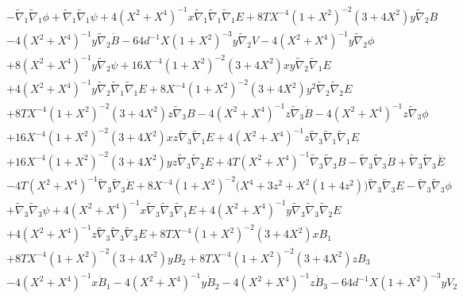 \documentclass[10pt,letterpaper]{article}
\numberwithin{equation}{section}
\begin{document}
\begin{appendices}
\begin{eqnarray}
&& -  \tilde{\nabla}_{1}\tilde{\nabla}_{1}\phi + \tilde{\nabla}_{1}\tilde{\nabla}_{1}\psi + 4 (X^2 + X^4)^{-1} x \tilde{\nabla}_{1}\tilde{\nabla}_{1}\tilde{\nabla}_{1}E + 8 T X^{-4} (1 + X^2)^{-2} (3 + 4 X^2) y \tilde{\nabla}_{2}B \nonumber \\ 
&& - 4 (X^2 + X^4)^{-1} y \tilde{\nabla}_{2}\dot{B} - 64 d^{-1} X (1 + X^2)^{-3} y \tilde{\nabla}_{2}V - 4 (X^2 + X^4)^{-1} y \tilde{\nabla}_{2}\phi \nonumber \\ 
&& + 8 (X^2 + X^4)^{-1} y \tilde{\nabla}_{2}\psi + 16 X^{-4} (1 + X^2)^{-2} (3 + 4 X^2) x y \tilde{\nabla}_{2}\tilde{\nabla}_{1}E \nonumber \\ 
&& + 4 (X^2 + X^4)^{-1} y \tilde{\nabla}_{2}\tilde{\nabla}_{1}\tilde{\nabla}_{1}E + 8 X^{-4} (1 + X^2)^{-2} (3 + 4 X^2) y^2 \tilde{\nabla}_{2}\tilde{\nabla}_{2}E \nonumber \\ 
&& + 8 T X^{-4} (1 + X^2)^{-2} (3 + 4 X^2) z \tilde{\nabla}_{3}B - 4 (X^2 + X^4)^{-1} z \tilde{\nabla}_{3}\dot{B} - 4 (X^2 + X^4)^{-1} z \tilde{\nabla}_{3}\phi \nonumber \\ 
&& + 16 X^{-4} (1 + X^2)^{-2} (3 + 4 X^2) x z \tilde{\nabla}_{3}\tilde{\nabla}_{1}E + 4 (X^2 + X^4)^{-1} z \tilde{\nabla}_{3}\tilde{\nabla}_{1}\tilde{\nabla}_{1}E \nonumber \\ 
&& + 16 X^{-4} (1 + X^2)^{-2} (3 + 4 X^2) y z \tilde{\nabla}_{3}\tilde{\nabla}_{2}E + 4 T (X^2 + X^4)^{-1} \tilde{\nabla}_{3}\tilde{\nabla}_{3}B -  \tilde{\nabla}_{3}\tilde{\nabla}_{3}\dot{B} + \tilde{\nabla}_{3}\tilde{\nabla}_{3}\overset{..}{E} \nonumber \\ 
&& - 4 T (X^2 + X^4)^{-1} \tilde{\nabla}_{3}\tilde{\nabla}_{3}\dot{E} + 8 X^{-4} (1 + X^2)^{-2} \bigl(X^4 + 3 z^2 + X^2 (1 + 4 z^2)\bigr) \tilde{\nabla}_{3}\tilde{\nabla}_{3}E -  \tilde{\nabla}_{3}\tilde{\nabla}_{3}\phi \nonumber \\ 
&& + \tilde{\nabla}_{3}\tilde{\nabla}_{3}\psi + 4 (X^2 + X^4)^{-1} x \tilde{\nabla}_{3}\tilde{\nabla}_{3}\tilde{\nabla}_{1}E + 4 (X^2 + X^4)^{-1} y \tilde{\nabla}_{3}\tilde{\nabla}_{3}\tilde{\nabla}_{2}E \nonumber \\ 
&& + 4 (X^2 + X^4)^{-1} z \tilde{\nabla}_{3}\tilde{\nabla}_{3}\tilde{\nabla}_{3}E+8 T X^{-4} (1 + X^2)^{-2} (3 + 4 X^2) x B_{1} \nonumber \\ 
&& + 8 T X^{-4} (1 + X^2)^{-2} (3 + 4 X^2) y B_{2} + 8 T X^{-4} (1 + X^2)^{-2} (3 + 4 X^2) z B_{3} \nonumber \\ 
&& - 4 (X^2 + X^4)^{-1} x \dot{B}_{1} - 4 (X^2 + X^4)^{-1} y \dot{B}_{2} - 4 (X^2 + X^4)^{-1} z \dot{B}_{3} - 64 d^{-1} X (1 + X^2)^{-3} y V_{2} \nonumber \\ 

\end{eqnarray}
\end{appendices}
\end{document}
